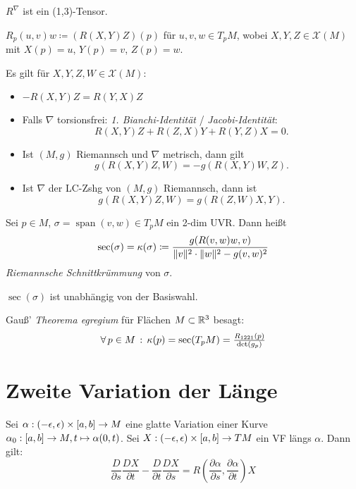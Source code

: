 \documentclass{cheat-sheet}
\newcommand{\vinterval}{\ointerval{-\epsilon}{\epsilon}} %
\DeclareMathOperator{\Span}{span} %
\newcommand{\abinterval}{\cinterval{a}{b}} %
\newcommand{\VF}{\mathcal{X}} %
\begin{document}
\begin{bem}
  $R^\nabla$ ist ein (1,3)-Tensor.
\end{bem}

\begin{nota}
  $R_p(u, v)w \coloneqq (R(X, Y)Z)(p)$ für $u, v, w \in T_p M$, wobei $X, Y, Z \in \VF(M)$ mit $X(p) \!=\! u$, $Y(p) \!=\! v$, $Z(p) \!=\! w$.
\end{nota}

\begin{satz}
  Es gilt für $X,Y,Z,W \in \VF(M)$:
  \begin{itemize}
    \item $- R(X, Y)Z = R(Y, X)Z$
    \item Falls $\nabla$ torsionsfrei: \emph{1. Bianchi-Identität} / \emph{Jacobi-Identität}:
    \[ R(X,Y)Z + R(Z,X)Y + R(Y,Z)X = 0. \]
    \item Ist $(M, g)$ Riemannsch und $\nabla$ metrisch, dann gilt
    \[ g(R(X,Y)Z, W) = -g(R(X,Y)W, Z). \]
    \item Ist $\nabla$ der LC-Zshg von $(M, g)$ Riemannsch, dann ist
    \[ g(R(X, Y)Z, W) = g(R(Z,W)X,Y). \]
  \end{itemize}
\end{satz}


\begin{defn}
  Sei $p \in M$, $\sigma = \Span(v,w) \in T_p M$ ein 2-dim UVR. Dann heißt
  \[ \sec(\sigma) = \kappa(\sigma) \coloneqq \frac{g(R(v,w)w,v)}{\lVert v\rVert^2 \cdot \lVert w\rVert^2 - g(v,w)^2} \]
  \emph{Riemannsche Schnittkrümmung} von $\sigma$.
\end{defn}

\begin{lem}
  $\sec(\sigma)$ ist unabhängig von der Basiswahl.
\end{lem}

\begin{bem}
  Gauß' \textit{Theorema egregium} für Flächen $M \subset \mathbb{R}^3$ besagt:
  \[
    \forall \, {p \in M} \,:\, \kappa(p) = \sec(T_p M) = \tfrac{R_{1221}(p)}{\det(g_p)}
  \]
\end{bem}

\section{Zweite Variation der Länge}

\begin{satz}
  Sei $\alpha : \vinterval \times \abinterval \to M$ eine glatte Variation einer Kurve $\alpha_0 : \abinterval \to M, t \mapsto \alpha(0, t)$.
  Sei $X : \vinterval \times \abinterval \to TM$ ein VF längs $\alpha$. Dann gilt:
  \[
    \frac{D}{\partial s} \frac{DX}{\partial t} - \frac{D}{\partial t} \frac{DX}{\partial s} = R\left(\frac{\partial \alpha}{\partial s}, \frac{\partial \alpha}{\partial t}\right) X
  \]
\end{satz}
\end{document}
